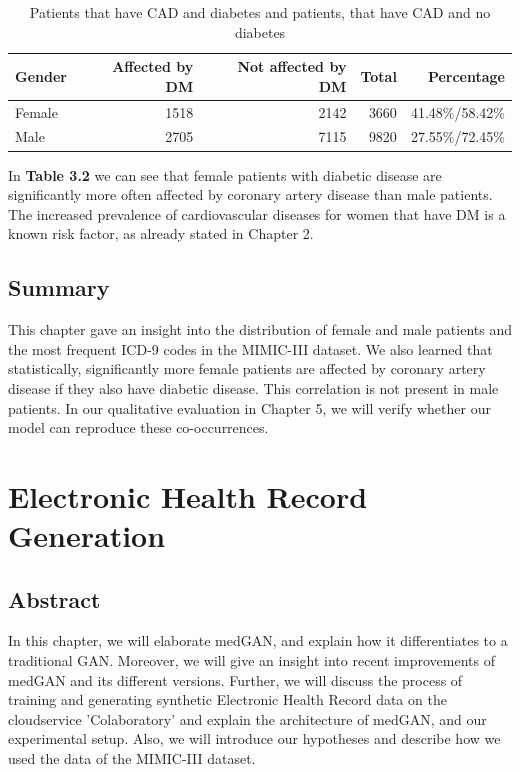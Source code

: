 \documentclass[11pt, a4paper, oneside]{book}
\begin{document}
\begin{table}
\begin{center}
\begin{tabularx}{\textwidth}{X|r|r|r|r}
\textbf{Gender} & \textbf{Affected by DM} & \textbf{Not affected by DM} & \textbf{Total} & \textbf{Percentage}\\
\hline
Female & 1518 & 2142 & 3660 & 41.48\%/58.42\%\\
Male 	& 2705 & 7115 & 9820 & 27.55\%/72.45\%\\
\end{tabularx}
\caption{\label{tab:cad-diabetic}Patients that have CAD and diabetes and patients, that have CAD and no diabetes}
\end{center}
\end{table}


In \textbf{Table 3.2} we can see that female patients with diabetic disease are significantly more often affected by coronary artery disease than male patients. The increased prevalence of cardiovascular diseases for women that have DM is a known risk factor, as already stated in Chapter 2.


\section{Summary}
This chapter gave an insight into the distribution of female and male patients and the most frequent ICD-9 codes in the MIMIC-III dataset. We also learned that statistically, significantly more female patients are affected by coronary artery disease if they also have diabetic disease. This correlation is not present in male patients.  
In our qualitative evaluation in Chapter 5, we will verify whether our model can reproduce these co-occurrences.

\chapter{Electronic Health Record Generation}
\section{Abstract}
In this chapter, we will elaborate medGAN, and explain how it differentiates to a traditional GAN. Moreover, we will give an insight into recent improvements of medGAN and its different versions. Further, we will discuss the process of training and generating synthetic Electronic Health Record data on the cloudservice 'Colaboratory' and explain the architecture of medGAN, and our experimental setup. Also, we will introduce our hypotheses and describe how we used the data of the MIMIC-III dataset.
\end{document}
